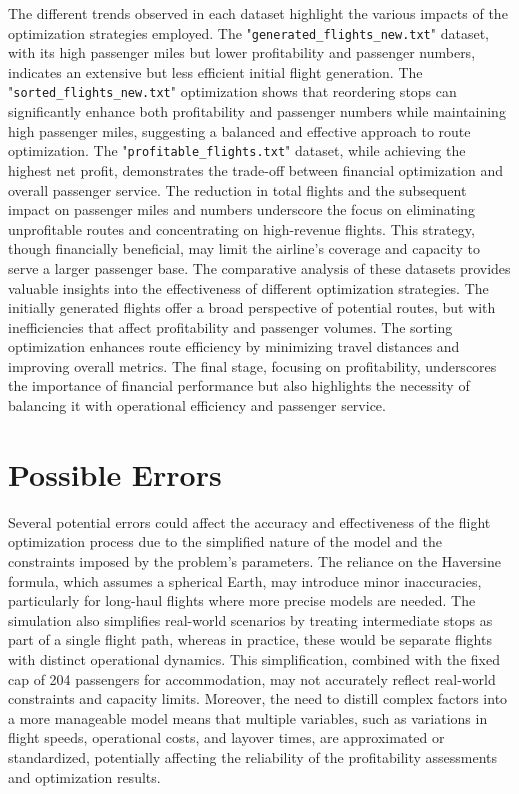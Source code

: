 \documentclass{article}
\begin{document}
The different trends observed in each dataset highlight the various impacts of the optimization strategies employed. The "\texttt{generated\_flights\_new.txt}" dataset, with its high passenger miles but lower profitability and passenger numbers, indicates an extensive but less efficient initial flight generation. The "\texttt{sorted\_flights\_new.txt}" optimization shows that reordering stops can significantly enhance both profitability and passenger numbers while maintaining high passenger miles, suggesting a balanced and effective approach to route optimization.
The "\texttt{profitable\_flights.txt}" dataset, while achieving the highest net profit, demonstrates the trade-off between financial optimization and overall passenger service. The reduction in total flights and the subsequent impact on passenger miles and numbers underscore the focus on eliminating unprofitable routes and concentrating on high-revenue flights. This strategy, though financially beneficial, may limit the airline's coverage and capacity to serve a larger passenger base.
The comparative analysis of these datasets provides valuable insights into the effectiveness of different optimization strategies. The initially generated flights offer a broad perspective of potential routes, but with inefficiencies that affect profitability and passenger volumes. The sorting optimization enhances route efficiency by minimizing travel distances and improving overall metrics. The final stage, focusing on profitability, underscores the importance of financial performance but also highlights the necessity of balancing it with operational efficiency and passenger service. 

\section{Possible Errors}

Several potential errors could affect the accuracy and effectiveness of the flight optimization process due to the simplified nature of the model and the constraints imposed by the problem's parameters. The reliance on the Haversine formula, which assumes a spherical Earth, may introduce minor inaccuracies, particularly for long-haul flights where more precise models are needed. The simulation also simplifies real-world scenarios by treating intermediate stops as part of a single flight path, whereas in practice, these would be separate flights with distinct operational dynamics. This simplification, combined with the fixed cap of 204 passengers for accommodation, may not accurately reflect real-world constraints and capacity limits. Moreover, the need to distill complex factors into a more manageable model means that multiple variables, such as variations in flight speeds, operational costs, and layover times, are approximated or standardized, potentially affecting the reliability of the profitability assessments and optimization results.\\
\\
\end{document}
